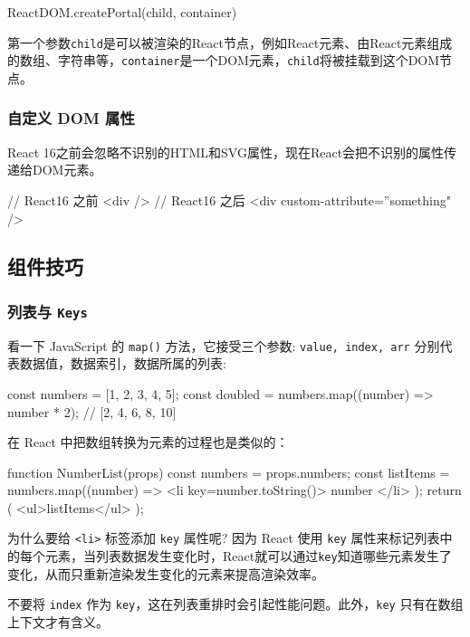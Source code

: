 \begin{JavaScript}
ReactDOM.createPortal(child, container) 
\end{JavaScript}

第一个参数\texttt{child}是可以被渲染的React节点，例如React元素、由React元素组成的数组、字符串等，\texttt{container}是一个DOM元素，\texttt{child}将被挂载到这个DOM节点。

\subsubsection*{自定义 DOM 属性}

React 16之前会忽略不识别的HTML和SVG属性，现在React会把不识别的属性传递给DOM元素。

\begin{JavaScript}
// React16 之前
<div /> 
// React16 之后
<div custom-attribute=”something" /> 
\end{JavaScript}

\subsection{组件技巧}

\subsubsection{列表与 \texttt{Keys}}

看一下 JavaScript 的 \texttt{map()} 方法，它接受三个参数: \texttt{value, index, arr} 分别代表数据值，数据索引，数据所属的列表:
\begin{JavaScript}
const numbers = [1, 2, 3, 4, 5];
const doubled = numbers.map((number) => number * 2);
// [2, 4, 6, 8, 10]
\end{JavaScript}

在 React 中把数组转换为元素的过程也是类似的：

\begin{JavaScript}
function NumberList(props) {
  const numbers = props.numbers;
  const listItems = numbers.map((number) =>
    <li key={number.toString()}>
      {number}
    </li>
  );
  return (
    <ul>{listItems}</ul>
  );
}
\end{JavaScript}

为什么要给 \texttt{<li>} 标签添加 \texttt{key} 属性呢? 因为 React 使用 \texttt{key} 属性来标记列表中的每个元素，当列表数据发生变化时，React就可以通过\texttt{key}知道哪些元素发生了变化，从而只重新渲染发生变化的元素来提高渲染效率。

不要将 \texttt{index} 作为 \texttt{key}，这在列表重排时会引起性能问题。此外，\texttt{key} 只有在数组上下文才有含义。

